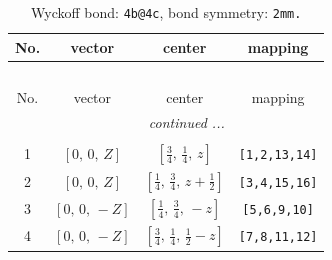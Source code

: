 \documentclass[fleqn,8pt]{jsarticle}
\begin{document}
\begin{longtable}{cccc}
\caption{Wyckoff bond: {\tt 4b@4c}, bond symmetry: {\tt 2mm.}}
 \\
 \hline \hline
No. & vector & center & mapping \\ \hline \endfirsthead

\multicolumn{3}{l}{\tablename\ \thetable{}} \\
 \hline \hline
No. & vector & center & mapping \\ \hline \endhead

 \hline \hline
\multicolumn{3}{r}{\footnotesize\it continued ...} \\ \endfoot

 \hline \hline
\multicolumn{3}{r}{} \\ \endlastfoot

1 & $\left[ 0,\, 0,\, Z \right]$ & $\left[ \frac{3}{4},\, \frac{1}{4},\, z \right]$ & {\tt [1,2,13,14]} \\ \hline
2 & $\left[ 0,\, 0,\, Z \right]$ & $\left[ \frac{1}{4},\, \frac{3}{4},\, z + \frac{1}{2} \right]$ & {\tt [3,4,15,16]} \\ \hline
3 & $\left[ 0,\, 0,\, - Z \right]$ & $\left[ \frac{1}{4},\, \frac{3}{4},\, - z \right]$ & {\tt [5,6,9,10]} \\ \hline
4 & $\left[ 0,\, 0,\, - Z \right]$ & $\left[ \frac{3}{4},\, \frac{1}{4},\, \frac{1}{2} - z \right]$ & {\tt [7,8,11,12]} \\
\end{longtable}
\renewcommand{\arraystretch}{1.2}
\end{document}
